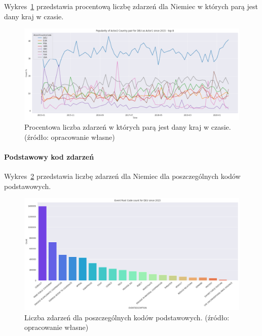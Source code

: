 \documentclass[11pt]{report}
\begin{document}
    Wykres~\ref{fig:DEUpairPerc} przedstawia procentową liczbę zdarzeń dla Niemiec w których parą jest dany kraj w czasie.
    \begin{figure}[!htp]
        \centering
        \includegraphics[width=\linewidth]{fig/DEU/DEUactor2PairPercinTIME.png}
        \caption{Procentowa liczba zdarzeń w których parą jest dany kraj w czasie. (źródło: opracowanie własne)}
        \label{fig:DEUpairPerc}
    \end{figure}

    \paragraph{Podstawowy kod zdarzeń}

    Wykres~\ref{fig:DEUPERC} przedstawia liczbę zdarzeń dla Niemiec dla poszczególnych kodów podstawowych.


    \begin{figure}[!htp]
        \centering
        \includegraphics[width=\linewidth]{fig/DEU/DEUERC.png}
        \caption{Liczba zdarzeń dla poszczególnych kodów podstawowych. (źródło: opracowanie własne)}
        \label{fig:DEUPERC}
    \end{figure}
\end{document}
